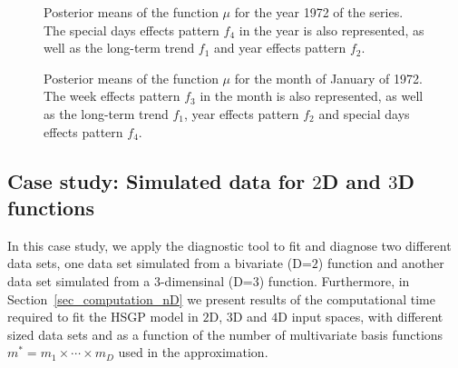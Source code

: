 \begin{figure}%
\centering
{}
\caption{Posterior means of the function $\mu$ for the year 1972 of the series. The special days effects pattern $f_4$ in the year is also represented, as well as the long-term trend $f_1$ and year effects pattern $f_2$. }
  \label{fig16_posteriors_oneyear_birthday}
\end{figure}

\begin{figure}%
\centering
{}
\caption{Posterior means of the function $\mu$ for the month of January of 1972. The week effects pattern $f_3$ in the month is also represented, as well as the long-term trend $f_1$, year effects pattern $f_2$ and special days effects pattern $f_4$. }
  \label{fig17_posteriors_onemonth_birthday}
\end{figure}

\subsection{Case study: Simulated data for $2$D and $3$D functions}\label{sec_caseIII}

In this case study, we apply the diagnostic tool to fit and diagnose two different data sets, one data set simulated from a bivariate (D=$2$) function and another data set simulated from a $3$-dimensinal (D=$3$) function. Furthermore, in Section~\ref{sec_computation_nD} we present results of the computational time required to fit the HSGP model in $2$D, $3$D and $4$D input spaces, with different sized data sets and as a function of the number of multivariate basis functions $m^*=m_1\times \cdots \times m_D$ used in the approximation.

